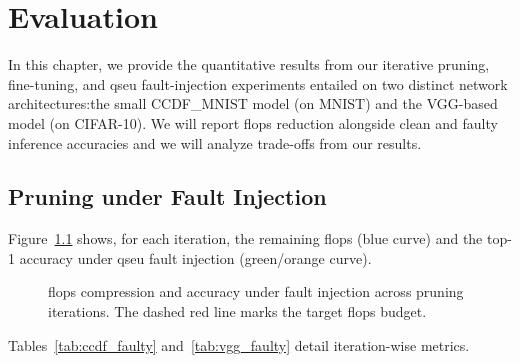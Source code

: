\chapter{Evaluation}
\label{chap:evaluation}

In this chapter, we provide the quantitative results from our iterative pruning, fine-tuning, and \gls{qseu} fault-injection experiments entailed on two distinct network architectures:the small CCDF\_MNIST model (on MNIST) and the VGG-based model (on CIFAR-10). We will report \gls{flops} reduction alongside clean and faulty inference accuracies and we will analyze trade-offs from our results.

\section{Pruning under Fault Injection}
\label{sec:results_fault_injection}

Figure~\ref{fig:faulty_results} shows, for each iteration, the remaining \gls{flops} (blue curve) and the top-1 accuracy under \gls{qseu} fault injection (green/orange curve).  

\begin{figure}[H]
  \centering
  \quad
  \caption{\gls{flops} compression and accuracy under fault injection across pruning iterations. The dashed red line marks the target \gls{flops} budget.}
  \label{fig:faulty_results}
\end{figure}

Tables~\ref{tab:ccdf_faulty} and~\ref{tab:vgg_faulty} detail iteration-wise metrics.

